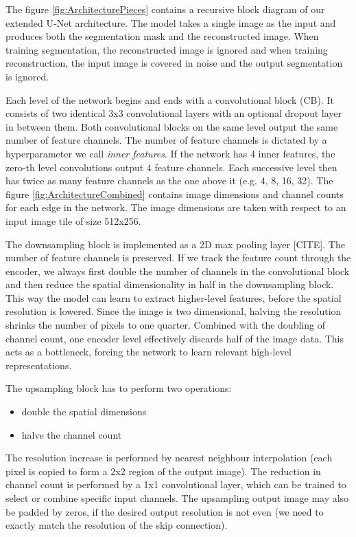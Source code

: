 The figure \ref{fig:ArchitecturePieces} contains a recursive block diagram of our extended U-Net architecture. The model takes a single image as the input and produces both the segmentation mask and the reconstructed image. When training segmentation, the reconstructed image is ignored and when training reconstruction, the input image is covered in noise and the output segmentation is ignored.

Each level of the network begins and ends with a convolutional block (CB). It consists of two identical 3x3 convolutional layers with an optional dropout layer in between them. Both convolutional blocks on the same level output the same number of feature channels. The number of feature channels is dictated by a hyperparameter we call \emph{inner features}. If the network has 4 inner features, the zero-th level convolutions output 4 feature channels. Each successive level then has twice as many feature channels as the one above it (e.g. 4, 8, 16, 32). The figure \ref{fig:ArchitectureCombined} contains image dimensions and channel counts for each edge in the network. The image dimensions are taken with respect to an input image tile of size 512x256.

The downsampling block is implemented as a 2D max pooling layer [CITE]. The number of feature channels is preserved. If we track the feature count through the encoder, we always first double the number of channels in the convolutional block and then reduce the spatial dimensionality in half in the downsampling block. This way the model can learn to extract higher-level features, before the spatial resolution is lowered. Since the image is two dimensional, halving the resolution shrinks the number of pixels to one quarter. Combined with the doubling of channel count, one encoder level effectively discards half of the image data. This acts as a bottleneck, forcing the network to learn relevant high-level representations.

The upsampling block has to perform two operations:

\begin{itemize}
    \item double the spatial dimensions
    \item halve the channel count
\end{itemize}

The resolution increase is performed by nearest neighbour interpolation (each pixel is copied to form a 2x2 region of the output image). The reduction in channel count is performed by a 1x1 convolutional layer, which can be trained to select or combine specific input channels. The upsampling output image may also be padded by zeros, if the desired output resolution is not even (we need to exactly match the resolution of the skip connection).


